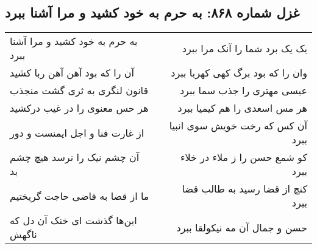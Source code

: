 \begin{center}
\section*{غزل شماره ۸۶۸: به حرم به خود کشید و مرا آشنا ببرد}
\label{sec:0868}
\begin{longtable}{l p{0.5cm} r}
به حرم به خود کشید و مرا آشنا ببرد
&&
یک یک برد شما را آنک مرا ببرد
\\
آن را که بود آهن آهن ربا کشید
&&
وان را که بود برگ کهی کهربا ببرد
\\
قانون لنگری به ثری گشت منجذب
&&
عیسی مهتری را جذب سما ببرد
\\
هر حس معنوی را در غیب درکشید
&&
هر مس اسعدی را هم کیمیا ببرد
\\
از غارت فنا و اجل ایمنست و دور
&&
آن کس که رخت خویش سوی انبیا ببرد
\\
آن چشم نیک را نرسد هیچ چشم بد
&&
کو شمع حسن را ز ملاء در خلاء ببرد
\\
ما از قضا به قاضی حاجت گریختیم
&&
کنچ از قضا رسید به طالب قضا ببرد
\\
این‌ها گذشت ای خنک آن دل که ناگهش
&&
حسن و جمال آن مه نیکولقا ببرد
\\
\end{longtable}
\end{center}
